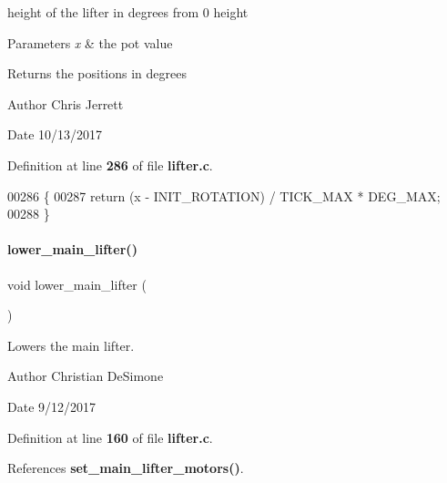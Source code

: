 height of the lifter in degrees from 0 height 


\begin{DoxyParams}{Parameters}
{\em x} & the pot value \\
\hline
\end{DoxyParams}
\begin{DoxyReturn}{Returns}
the positions in degrees 
\end{DoxyReturn}
\begin{DoxyAuthor}{Author}
Chris Jerrett 
\end{DoxyAuthor}
\begin{DoxyDate}{Date}
10/13/2017 
\end{DoxyDate}


Definition at line \textbf{ 286} of file \textbf{ lifter.\+c}.


\begin{DoxyCode}
00286                                          \{
00287   \textcolor{keywordflow}{return} (x - INIT\_ROTATION) / TICK\_MAX * DEG\_MAX;
00288 \}
\end{DoxyCode}
\mbox{\label{lifter_8h_ad36c37086a91046af4e6f619618b7719}} 
\paragraph{lower\+\_\+main\+\_\+lifter()}
{\footnotesize\ttfamily void lower\+\_\+main\+\_\+lifter (\begin{DoxyParamCaption}{ }\end{DoxyParamCaption})}



Lowers the main lifter. 

\begin{DoxyAuthor}{Author}
Christian De\+Simone 
\end{DoxyAuthor}
\begin{DoxyDate}{Date}
9/12/2017 
\end{DoxyDate}


Definition at line \textbf{ 160} of file \textbf{ lifter.\+c}.



References \textbf{ set\+\_\+main\+\_\+lifter\+\_\+motors()}.


